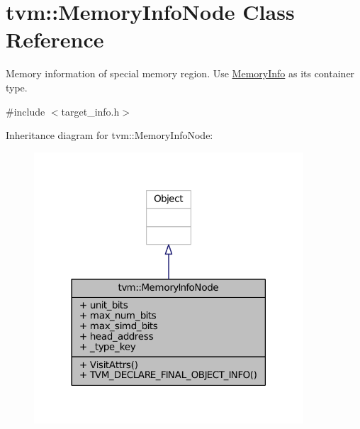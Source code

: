 \hypertarget{classtvm_1_1MemoryInfoNode}{}\section{tvm\+:\+:Memory\+Info\+Node Class Reference}
\label{classtvm_1_1MemoryInfoNode}


Memory information of special memory region. Use \hyperlink{classtvm_1_1MemoryInfo}{Memory\+Info} as its container type.  




{\ttfamily \#include $<$target\+\_\+info.\+h$>$}



Inheritance diagram for tvm\+:\+:Memory\+Info\+Node\+:
\nopagebreak
\begin{figure}[H]
\begin{center}
\leavevmode
\includegraphics[width=285pt]{classtvm_1_1MemoryInfoNode__inherit__graph}
\end{center}
\end{figure}


